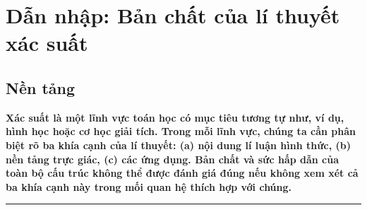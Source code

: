 \chapter{Dẫn nhập: Bản chất của lí thuyết xác suất}

\section{Nền tảng}
{\bf Xác suất là một lĩnh vực toán học có mục tiêu tương tự như, ví dụ, hình học hoặc cơ học giải tích. Trong mỗi lĩnh vực, chúng ta cần phân biệt rõ ba khía cạnh của lí thuyết: (a) nội dung lí luận hình thức, (b) nền tảng trực giác, (c) các ứng dụng. Bản chất và sức hấp dẫn của toàn bộ cấu trúc không thể được đánh giá đúng nếu không xem xét cả ba khía cạnh này trong mối quan hệ thích hợp với chúng.}

\noindent\rule{\textwidth}{.4pt} 

